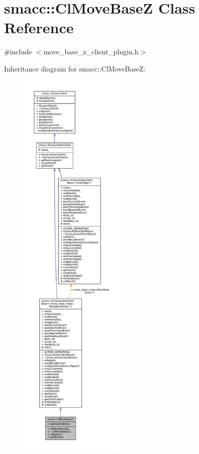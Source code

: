 \hypertarget{classsmacc_1_1ClMoveBaseZ}{}\section{smacc\+:\+:Cl\+Move\+BaseZ Class Reference}
\label{classsmacc_1_1ClMoveBaseZ}


{\ttfamily \#include $<$move\+\_\+base\+\_\+z\+\_\+client\+\_\+plugin.\+h$>$}



Inheritance diagram for smacc\+:\+:Cl\+Move\+BaseZ\+:
\nopagebreak
\begin{figure}[H]
\begin{center}
\leavevmode
\includegraphics[height=550pt]{classsmacc_1_1ClMoveBaseZ__inherit__graph}
\end{center}
\end{figure}


